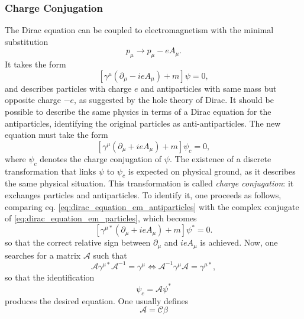 \subsubsection{Charge Conjugation}

The Dirac equation can be coupled to electromagnetism with the minimal substitution
\[
    p_\mu \to p_\mu -eA_\mu.
\]
It takes the form
\begin{equation}
    \left[\gamma^{\mu} (\partial_\mu - i e A_\mu) + m \right] \psi = 0,
    \label{eq:dirac_equation_em_particles}
\end{equation}
and describes particles with charge \(e\) and antiparticles with same mass but opposite charge \(-e\), as suggested by the hole theory of Dirac. It should be possible to describe the same physics in terms of a Dirac equation for the antiparticles, identifying the original particles as anti-antiparticles.
The new equation must take the form
\begin{equation}
    \left[\gamma^{\mu} (\partial_\mu + i e A_\mu) + m \right] \psi_c = 0,
    \label{eq:dirac_equation_em_antiparticles}
\end{equation}
where \(\psi_c\) denotes the charge conjugation of \(\psi\). The existence of a discrete transformation that links \(\psi\) to \(\psi_c\) is expected on physical ground, as it describes the same physical situation.
This transformation is called \textit{charge conjugation}: it exchanges particles and antiparticles. To identify it, one proceeds as follows, comparing eq. \eqref{eq:dirac_equation_em_antiparticles} with the complex conjugate of \eqref{eq:dirac_equation_em_particles}, which becomes
\[
    \left[\gamma^{\mu *} (\partial_\mu + i e A_\mu) + m \right] \psi^* = 0.
\]
so that the correct relative sign between \(\partial_\mu\) and \(ieA_\mu\) is achieved. Now, one searches for a matrix \(\mathcal{A}\) such that
\begin{equation}
    \mathcal{A} \gamma^{\mu *} \mathcal{A}^{-1} = \gamma^{\mu} \iff \mathcal{A}^{-1} \gamma^{\mu} \mathcal{A} = \gamma^{\mu *},
    \label{eq:charge_conjugation_gamma_condition_A}
\end{equation}
so that the identification
\begin{equation}
    \psi_c = \mathcal{A} \psi^*
    \label{eq:charge_conjugation_transformation_A}
\end{equation}
produces the desired equation. One usually defines
\begin{equation}
    \mathcal{A} = \mathcal{C} \beta
    \label{eq:charge_conjugation_A_C_relation}
\end{equation}
